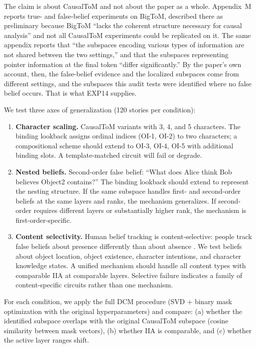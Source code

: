 \documentclass{article}
\begin{document}
The claim is about CausalToM and not about the paper as a whole. Appendix~M reports true- and
false-belief experiments on BigToM, described there as preliminary because BigToM ``lacks the
coherent structure necessary for causal analysis'' and not all CausalToM experiments could be
replicated on it. The same appendix reports that ``the subspaces encoding various types of
information are not shared between the two settings,'' and that the subspaces representing
pointer information at the final token ``differ significantly.'' By the paper's own account,
then, the false-belief evidence and the localized subspaces come from different settings, and
the subspaces this audit tests were identified where no false belief occurs. That is what
EXP14 supplies.

We test three axes of generalization (120 stories per condition):

\begin{enumerate}
\item \textbf{Character scaling.} CausalToM variants with 3, 4, and 5 characters. The binding lookback assigns ordinal indices (OI-1, OI-2) to two characters; a compositional scheme should extend to OI-3, OI-4, OI-5 with additional binding slots. A template-matched circuit will fail or degrade.
\item \textbf{Nested beliefs.} Second-order false belief: ``What does Alice think Bob believes Object2 contains?'' The binding lookback should extend to represent the nesting structure. If the same subspace handles first- and second-order beliefs at the same layers and ranks, the mechanism generalizes. If second-order requires different layers or substantially higher rank, the mechanism is first-order-specific.
\item \textbf{Content selectivity.} Human belief tracking is content-selective: people track false beliefs about presence differently than about absence \citep{kovacs2014beliefs}. We test beliefs about object location, object existence, character intentions, and character knowledge states. A unified mechanism should handle all content types with comparable IIA at comparable layers. Selective failure indicates a family of content-specific circuits rather than one mechanism.
\end{enumerate}

For each condition, we apply the full DCM procedure (SVD + binary mask optimization with the original hyperparameters) and compare: (a) whether the identified subspace overlaps with the original CausalToM subspace (cosine similarity between mask vectors), (b) whether IIA is comparable, and (c) whether the active layer ranges shift.
\end{document}
